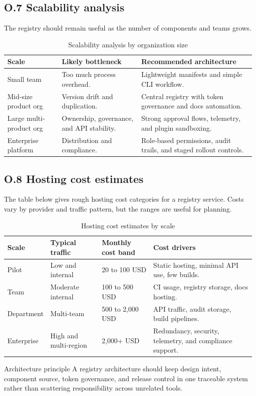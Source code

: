 \subsection*{O.7 Scalability analysis}
The registry should remain useful as the number of components and teams grows.

\begin{table}[htbp]
  \centering
  \caption{Scalability analysis by organization size}
  \begin{tabularx}{\textwidth}{@{}p{}p{}Y@{}}
    \toprule
    \textbf{Scale} & \textbf{Likely bottleneck} & \textbf{Recommended architecture} \\
    \midrule
    Small team & Too much process overhead. & Lightweight manifests and simple CLI workflow. \\
    Mid-size product org & Version drift and duplication. & Central registry with token governance and docs automation. \\
    Large multi-product org & Ownership, governance, and API stability. & Strong approval flows, telemetry, and plugin sandboxing. \\
    Enterprise platform & Distribution and compliance. & Role-based permissions, audit trails, and staged rollout controls. \\
    \bottomrule
  \end{tabularx}
\end{table}

\subsection*{O.8 Hosting cost estimates}
The table below gives rough hosting cost categories for a registry service. Costs vary by provider and traffic pattern, but the ranges are useful for planning.

\begin{table}[htbp]
  \centering
  \caption{Hosting cost estimates by scale}
  \begin{tabularx}{\textwidth}{@{}p{}p{}p{}Y@{}}
    \toprule
    \textbf{Scale} & \textbf{Typical traffic} & \textbf{Monthly cost band} & \textbf{Cost drivers} \\
    \midrule
    Pilot & Low and internal & 20 to 100 USD & Static hosting, minimal API use, few builds. \\
    Team & Moderate internal & 100 to 500 USD & CI usage, registry storage, docs hosting. \\
    Department & Multi-team & 500 to 2,000 USD & API traffic, audit storage, build pipelines. \\
    Enterprise & High and multi-region & 2,000+ USD & Redundancy, security, telemetry, and compliance support. \\
    \bottomrule
  \end{tabularx}
\end{table}

\begin{highlightbox}{Architecture principle}
A registry architecture should keep design intent, component source, token governance, and release control in one traceable system rather than scattering responsibility across unrelated tools.
\end{highlightbox}
